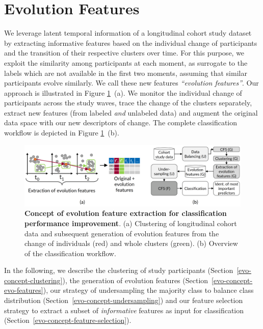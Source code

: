 \documentclass[
  oneside]{book}
\begin{document}
\hypertarget{evo-concept}{%
\section{Evolution Features}\label{evo-concept}}

We leverage latent temporal information of a longitudinal cohort study dataset by extracting informative features based on the individual change of participants and the transition of their respective clusters over time.
For this purpose, we exploit the similarity among participants at each moment, as surrogate to the labels which are not available in the first two moments, assuming that similar participants evolve similarly.
We call these new features \emph{``evolution features''}.
Our approach is illustrated in Figure \ref{fig:07-concept-workflow}~(a).
We monitor the individual change of participants across the study waves, trace the change of the clusters separately, extract new features (from labeled \emph{and} unlabeled data) and augment the original data space with our new descriptors of change.
The complete classification workflow is depicted in Figure \ref{fig:07-concept-workflow}~(b).



\begin{figure}[h]

{\centering \includegraphics[width=1\linewidth]{figures/07-concept-workflow} 

}

\caption{\textbf{Concept of evolution feature extraction for classification performance improvement}. (a) Clustering of longitudinal cohort data and subsequent generation of evolution features from the change of individuals (red) and whole clusters (green). (b) Overview of the classification workflow.}\label{fig:07-concept-workflow}
\end{figure}

In the following, we describe the clustering of study participants (Section~\ref{evo-concept-clustering}), the generation of evolution features (Section~\ref{evo-concept-evo-features}), our strategy of undersampling the majority class to balance class distribution (Section~\ref{evo-concept-undersampling}) and our feature selection strategy to extract a subset of \emph{informative} features as input for classification (Section~\ref{evo-concept-feature-selection}).
\end{document}
